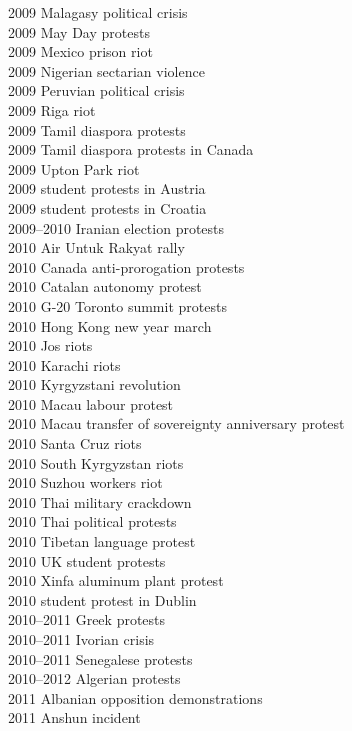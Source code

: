 2009 Malagasy political crisis\\
2009 May Day protests\\
2009 Mexico prison riot\\
2009 Nigerian sectarian violence\\
2009 Peruvian political crisis\\
2009 Riga riot\\
2009 Tamil diaspora protests\\
2009 Tamil diaspora protests in Canada\\
2009 Upton Park riot\\
2009 student protests in Austria\\
2009 student protests in Croatia\\
2009–2010 Iranian election protests\\
2010 Air Untuk Rakyat rally\\
2010 Canada anti-prorogation protests\\
2010 Catalan autonomy protest\\
2010 G-20 Toronto summit protests\\
2010 Hong Kong new year march\\
2010 Jos riots\\
2010 Karachi riots\\
2010 Kyrgyzstani revolution\\
2010 Macau labour protest\\
2010 Macau transfer of sovereignty anniversary protest\\
2010 Santa Cruz riots\\
2010 South Kyrgyzstan riots\\
2010 Suzhou workers riot\\
2010 Thai military crackdown\\
2010 Thai political protests\\
2010 Tibetan language protest\\
2010 UK student protests\\
2010 Xinfa aluminum plant protest\\
2010 student protest in Dublin\\
2010–2011 Greek protests\\
2010–2011 Ivorian crisis\\
2010–2011 Senegalese protests\\
2010–2012 Algerian protests\\
2011 Albanian opposition demonstrations\\
2011 Anshun incident\\
